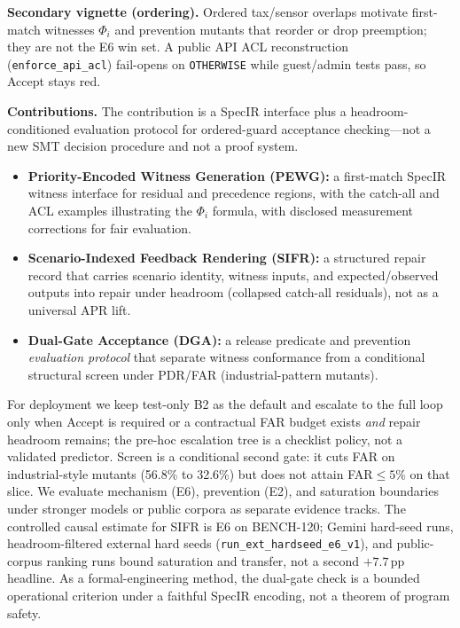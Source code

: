 \documentclass[10pt,conference]{IEEEtran}
\newcommand{\runin}[1]{\medskip\noindent\textbf{#1}\enspace}
\begin{document}
\runin{Secondary vignette (ordering).}
Ordered tax/sensor overlaps motivate first-match witnesses $\Phi_i$ and
prevention mutants that reorder or drop preemption; they are not the E6 win
set.
A public API ACL reconstruction (\texttt{enforce\_api\_acl}) fail-opens on
\texttt{OTHERWISE} while guest/admin tests pass, so Accept stays red.

\runin{Contributions.}
The contribution is a SpecIR interface plus a headroom-conditioned evaluation
protocol for ordered-guard acceptance checking---not a new SMT decision
procedure and not a proof system.
\begin{itemize}
  \item \textbf{Priority-Encoded Witness Generation (PEWG):} a first-match
    SpecIR witness interface for residual and precedence regions, with the
    catch-all and ACL examples illustrating the $\Phi_i$ formula, with disclosed
    measurement corrections for fair evaluation.
  \item \textbf{Scenario-Indexed Feedback Rendering (SIFR):} a structured
    repair record that carries scenario identity, witness inputs, and
    expected/observed outputs into repair under headroom (collapsed
    catch-all residuals), not as a universal APR lift.
  \item \textbf{Dual-Gate Acceptance (DGA):} a release predicate and prevention
    \emph{evaluation protocol} that separate witness conformance from a
    conditional structural screen under PDR/FAR (industrial-pattern mutants).
\end{itemize}
For deployment we keep test-only B2 as the default and escalate to the full
loop only when Accept is required or a contractual FAR budget exists
\emph{and} repair headroom remains; the pre-hoc escalation tree is a checklist
policy, not a validated predictor.
Screen is a conditional second gate: it cuts FAR on industrial-style mutants
(56.8\% to 32.6\%) but does not attain FAR${\le}5\%$ on that slice.
We evaluate mechanism (E6), prevention (E2), and saturation boundaries under
stronger models or public corpora as separate evidence tracks.
The controlled causal estimate for SIFR is E6 on BENCH-120; Gemini hard-seed
runs, headroom-filtered external hard seeds
(\texttt{run\_ext\_hardseed\_e6\_v1}), and public-corpus ranking runs bound
saturation and transfer, not a second ${+}7.7$\,pp headline.
As a formal-engineering method, the dual-gate check is a bounded operational
criterion under a faithful SpecIR encoding, not a theorem of program safety.

\end{document}
